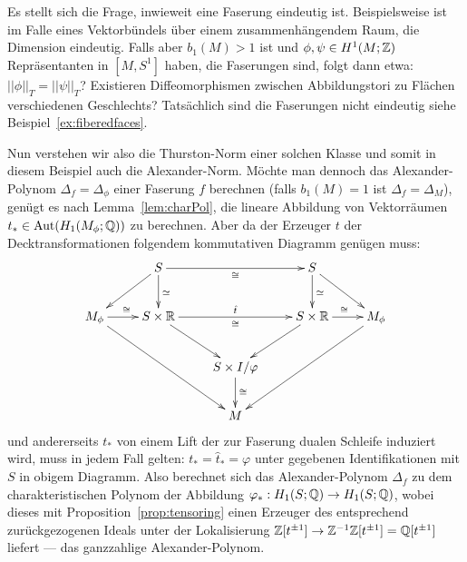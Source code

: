 \begin{bsp}
        Es stellt sich die Frage, inwieweit eine Faserung eindeutig ist. Beispielsweise ist im Falle eines Vektorbündels über einem zusammenhängendem Raum, die Dimension eindeutig. Falls aber $b_1(M)>1$ ist und $\phi,\psi \in H^1(M;\mathbb{Z})$ Repräsentanten in $[M,S^1]$ haben, die Faserungen sind, folgt dann etwa: $||\phi||_T=||\psi||_T$? Existieren Diffeomorphismen zwischen Abbildungstori zu Flächen verschiedenen Geschlechts? Tatsächlich sind die Faserungen nicht eindeutig siehe Beispiel~\ref{ex:fiberedfaces}.

        Nun verstehen wir also die Thurston-Norm einer solchen Klasse und somit in diesem Beispiel auch die Alexander-Norm.	Möchte man dennoch das Alexander-Polynom $\Delta_f=\Delta_\phi$ einer Faserung $f$ berechnen (falls $b_1(M)=1$ ist $\Delta_f=\Delta_M$), genügt es nach Lemma~\ref{lem:charPol}, die lineare Abbildung von Vektorräumen $t_* \in \operatorname{Aut}(H_1(M_\phi;\mathbb{Q}))$ zu berechnen. Aber da der Erzeuger $t$ der Decktransformationen folgendem kommutativen Diagramm genügen muss:
    	\begin{equation*}
     		    	\begin{xy}
    			\xymatrix{
    				&S \ar[d]^{\simeq} \ar[dl] \ar[rr]_\cong && S \ar[d]^{\simeq}\ar[dr]& \\
    				M_\phi \ar[ddrr] \ar[r]^\cong&S \times \RR \ar[rr]^{\hat t}_\cong \ar[dr] && S\times \RR \ar[dl] \ar[r]^\cong&M_\phi \ar[ddll]\\
    				&&S\times I / \varphi \ar[d]^\cong&&\\
                    &&M&&}
    		\end{xy}
    	\end{equation*}
    	und andererseits $t_*$ von einem Lift der zur Faserung dualen Schleife induziert wird, muss in jedem Fall gelten: $t_* = \hat t_* = \varphi$ unter gegebenen Identifikationen mit $S$ in obigem Diagramm. Also berechnet sich das Alexander-Polynom $\Delta_f$ zu dem charakteristischen Polynom der Abbildung $\varphi_*:H_1(S;\mathbb{Q})\to H_1(S;\mathbb{Q})$, wobei dieses mit Proposition~\ref{prop:tensoring} einen Erzeuger des entsprechend zurückgezogenen Ideals unter der Lokalisierung $\mathbb{Z}[t^{\pm 1}] \to \mathbb{Z}^{-1}\mathbb{Z}[t^{\pm 1}]=\mathbb{Q}[t^{\pm 1}]$ liefert --- das ganzzahlige Alexander-Polynom.%


\end{bsp}
